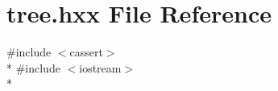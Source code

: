 \section{tree.\+hxx File Reference}
\label{tree_8hxx}
{\ttfamily \#include $<$cassert$>$}\\*
{\ttfamily \#include $<$iostream$>$}\\*
